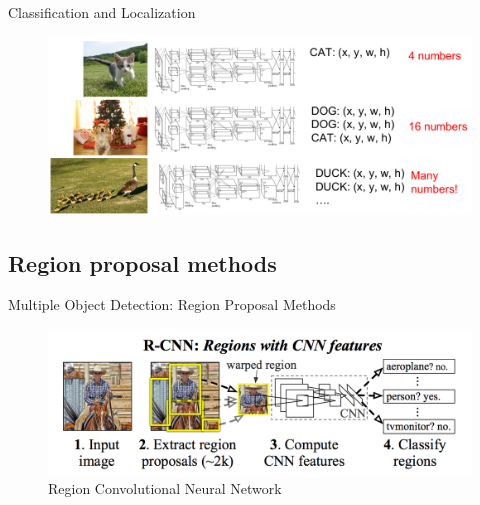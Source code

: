 \documentclass[aspectratio=169]{beamer}
\begin{document}
\begin{frame}{Classification and Localization}
\begin{figure}
    \centering
    \includegraphics[scale=.35]{demo/figs/ob2.png}
\end{figure}
\end{frame}

\subsection{Region proposal methods}

\begin{frame}{Multiple Object Detection: Region Proposal Methods}
\begin{figure}
    \centering
    \includegraphics[scale=.3]{demo/figs/rcnn.png}
    \caption{Region Convolutional Neural Network}
\end{figure}
\end{frame}
\end{document}
